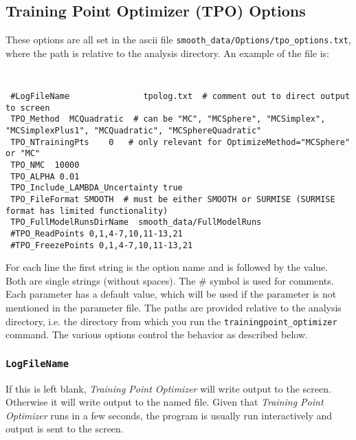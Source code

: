 \documentclass[UserManual.tex]{subfiles}
\begin{document}
\subsection{Training Point Optimizer (TPO) Options}
These options are all set in the ascii file {\tt smooth\_data/Options/tpo\_options.txt}, where the path is relative to the analysis directory. An example of the file is:
{\tt
\begin{verbatim}
 #LogFileName               tpolog.txt  # comment out to direct output to screen
 TPO_Method  MCQuadratic  # can be "MC", "MCSphere", "MCSimplex", "MCSimplexPlus1", "MCQuadratic", "MCSphereQuadratic"
 TPO_NTrainingPts    0   # only relevant for OptimizeMethod="MCSphere" or "MC"
 TPO_NMC  10000
 TPO_ALPHA 0.01
 TPO_Include_LAMBDA_Uncertainty true
 TPO_FileFormat SMOOTH  # must be either SMOOTH or SURMISE (SURMISE format has limited functionality)
 TPO_FullModelRunsDirName  smooth_data/FullModelRuns
 #TPO_ReadPoints 0,1,4-7,10,11-13,21
 #TPO_FreezePoints 0,1,4-7,10,11-13,21
\end{verbatim}
}
For each line the first string is the option name and is followed by the value. Both are single strings (without spaces). The \# symbol is used for comments. Each parameter has a default value, which will be used if the parameter is not mentioned in the parameter file.  The paths are provided relative to the analysis directory, i.e. the directory from which you run the {\tt trainingpoint\_optimizer} command. The various options control the behavior as described below.

\subsubsection{{\tt LogFileName}}
If this is left blank, {\it Training Point Optimizer} will write output to the screen. Otherwise it will write output to the named file. Given that {\it Training Point Optimizer} runs in a few seconds, the program is usually run interactively and output is sent to the screen.
\end{document}
